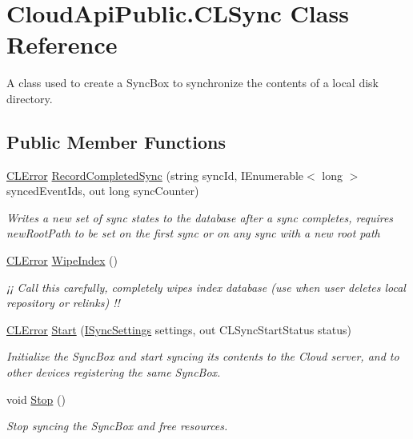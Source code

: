 \hypertarget{class_cloud_api_public_1_1_c_l_sync}{\section{Cloud\-Api\-Public.\-C\-L\-Sync Class Reference}
\label{class_cloud_api_public_1_1_c_l_sync}
}


A class used to create a Sync\-Box to synchronize the contents of a local disk directory.  


\subsection*{Public Member Functions}
\begin{DoxyCompactItemize}
\item 
\hyperlink{class_cloud_api_public_1_1_model_1_1_c_l_error}{C\-L\-Error} \hyperlink{class_cloud_api_public_1_1_c_l_sync_ae42abebf3134701ec50ea49002eb8291}{Record\-Completed\-Sync} (string sync\-Id, I\-Enumerable$<$ long $>$ synced\-Event\-Ids, out long sync\-Counter)
\begin{DoxyCompactList}\small\item\em Writes a new set of sync states to the database after a sync completes, requires new\-Root\-Path to be set on the first sync or on any sync with a new root path \end{DoxyCompactList}\item 
\hyperlink{class_cloud_api_public_1_1_model_1_1_c_l_error}{C\-L\-Error} \hyperlink{class_cloud_api_public_1_1_c_l_sync_a3bbf0e1f002b7cedd12e16562c071dce}{Wipe\-Index} ()
\begin{DoxyCompactList}\small\item\em ¡¡ Call this carefully, completely wipes index database (use when user deletes local repository or relinks) !! \end{DoxyCompactList}\item 
\hyperlink{class_cloud_api_public_1_1_model_1_1_c_l_error}{C\-L\-Error} \hyperlink{class_cloud_api_public_1_1_c_l_sync_a1b700631eb605ad6e065dc4296fcb912}{Start} (\hyperlink{interface_cloud_api_public_1_1_interfaces_1_1_i_sync_settings}{I\-Sync\-Settings} settings, out C\-L\-Sync\-Start\-Status status)
\begin{DoxyCompactList}\small\item\em Initialize the Sync\-Box and start syncing its contents to the Cloud server, and to other devices registering the same Sync\-Box. \end{DoxyCompactList}\item 
void \hyperlink{class_cloud_api_public_1_1_c_l_sync_aa76639968094d5dec2ec19e10163612f}{Stop} ()
\begin{DoxyCompactList}\small\item\em Stop syncing the Sync\-Box and free resources. \end{DoxyCompactList}\end{DoxyCompactItemize}
